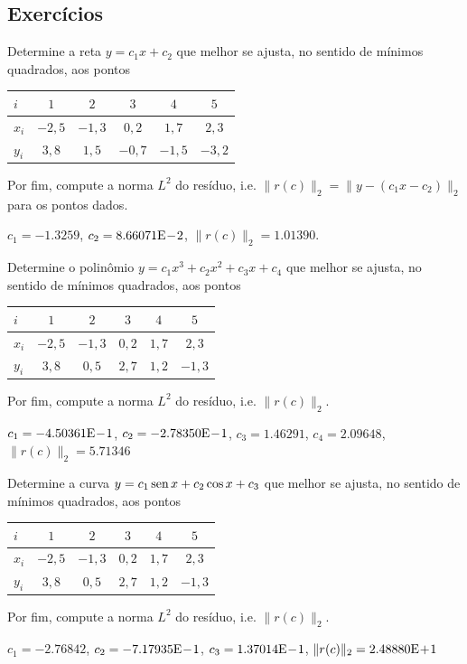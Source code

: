 \subsection*{Exercícios}

\begin{exer}
  Determine a reta $y = c_1x + c_2$ que melhor se ajusta, no sentido de mínimos quadrados, aos pontos
  \begin{center}
    \begin{tabular}{l|ccccc}
      $i$ & $1$ & $2$ & $3$ & $4$ & $5$ \\\hline
      $x_i$ & $-2,5$ & $-1,3$ & $0,2$ & $1,7$ & $2,3$\\
      $y_i$ & $3,8$ & $1,5$ & $-0,7$ & $-1,5$ & $-3,2$\\\hline
    \end{tabular}
  \end{center}
Por fim, compute a norma $L^2$ do resíduo, i.e. $\|r(c)\|_2 = \|y - (c_1x - c_2)\|_2$ para os pontos dados.
\end{exer}
\begin{resp}
  $c_1 = -1.3259$, $c_2 = 8.66071\mathrm{E}\!-\!2$, $\|r(c)\|_2 = 1.01390$.
\end{resp}

\begin{exer}
  Determine o polinômio $y = c_1x^3 + c_2x^2 + c_3x + c_4$ que melhor se ajusta, no sentido de mínimos quadrados, aos pontos
  \begin{center}
    \begin{tabular}{l|ccccc}
      $i$ & $1$ & $2$ & $3$ & $4$ & $5$ \\\hline
      $x_i$ & $-2,5$ & $-1,3$ & $0,2$ & $1,7$ & $2,3$\\
      $y_i$ & $3,8$ & $0,5$ & $2,7$ & $1,2$ & $-1,3$\\\hline
    \end{tabular}
  \end{center}
Por fim, compute a norma $L^2$ do resíduo, i.e. $\|r(c)\|_2$.
\end{exer}
\begin{resp}
  $c_1 = -4.50361\mathrm{E}\!-\!1$, $c_2 = -2.78350\mathrm{E}\!-\!1$, $c_3 = 1.46291$, $c_4 = 2.09648$, $\|r(c)\|_2 = 5.71346$
\end{resp}

\begin{exer}
  Determine a curva $y = c_1\operatorname{sen} x + c_2\cos x + c_3$ que melhor se ajusta, no sentido de mínimos quadrados, aos pontos
  \begin{center}
    \begin{tabular}{l|ccccc}
      $i$ & $1$ & $2$ & $3$ & $4$ & $5$ \\\hline
      $x_i$ & $-2,5$ & $-1,3$ & $0,2$ & $1,7$ & $2,3$\\
      $y_i$ & $3,8$ & $0,5$ & $2,7$ & $1,2$ & $-1,3$\\\hline
    \end{tabular}
  \end{center}
Por fim, compute a norma $L^2$ do resíduo, i.e. $\|r(c)\|_2$.
\end{exer}
\begin{resp}
  $c_1 = -2.76842$, $c_2 = -7.17935\mathrm{E}\!-\!1$, $c_3 = 1.37014\mathrm{E}\!-\!1$, $\|r(c)\|_2 = 2.48880\mathrm{E}\!+\!1$
\end{resp}

